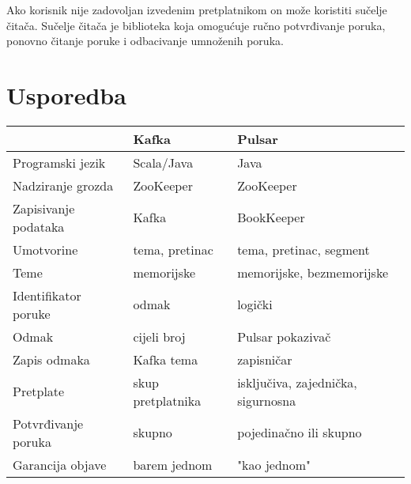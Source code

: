 \documentclass[utf8, diplomski, lmodern, numeric]{fer}
\begin{document}
Ako korisnik nije zadovoljan izvedenim pretplatnikom on može koristiti sučelje čitača. Sučelje čitača je biblioteka koja omogućuje ručno potvrđivanje poruka, ponovno čitanje poruke i odbacivanje umnoženih poruka.


\section{Usporedba}

\begin{table}[H]

\begin{adjustwidth}{-15mm}{15mm}

\begin{tabular}{|l|l|l|}
\hline
                            & \textbf{Kafka}                & \textbf{Pulsar}                                \\ \hline
Programski jezik            & Scala/Java                    & Java                                           \\ \hline
Nadziranje grozda           & ZooKeeper                     & ZooKeeper                                      \\ \hline
Zapisivanje podataka        & Kafka                         & BookKeeper                                     \\ \hline
Umotvorine                  & tema, pretinac                & tema, pretinac, segment                        \\ \hline
Teme                        & memorijske                    & memorijske, bezmemorijske                      \\ \hline
Identifikator poruke        & odmak                         & logički                                        \\ \hline
Odmak                       & cijeli broj                   & Pulsar pokazivač                               \\ \hline
Zapis odmaka                & Kafka tema                    & zapisničar                                     \\ \hline
Pretplate                   & skup pretplatnika             & isključiva, zajednička, sigurnosna             \\ \hline
Potvrđivanje poruka         & skupno                        & pojedinačno ili skupno                         \\ \hline
Garancija objave            & barem jednom                  & "kao jednom"                                   \\ \hline

\end{tabular}
\end{adjustwidth}
\end{table}
\end{document}
